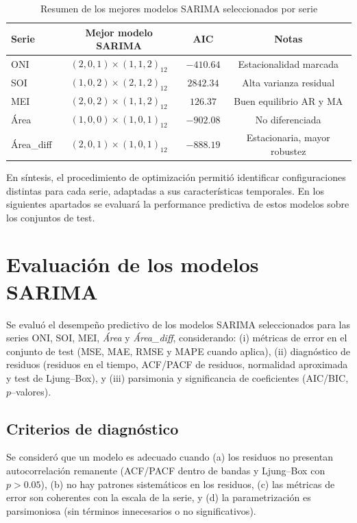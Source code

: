 \begin{table}[H]
    \centering
    \caption{Resumen de los mejores modelos SARIMA seleccionados por serie}
    \begin{tabular}{lccc}
        \toprule
        \textbf{Serie} & \textbf{Mejor modelo SARIMA} & \textbf{AIC} & \textbf{Notas} \\
        \midrule
        ONI   & $(2,0,1)\times(1,1,2)_{12}$ & $-410.64$ & Estacionalidad marcada \\
        SOI   & $(1,0,2)\times(2,1,2)_{12}$ & $2842.34$ & Alta varianza residual \\
        MEI   & $(2,0,2)\times(1,1,2)_{12}$ & $126.37$  & Buen equilibrio AR y MA \\
        Área  & $(1,0,0)\times(1,0,1)_{12}$ & $-902.08$ & No diferenciada \\
        Área\_diff & $(2,0,1)\times(1,0,1)_{12}$ & $-888.19$ & Estacionaria, mayor robustez \\
        \bottomrule
    \end{tabular}
    \label{tab:sarima_modelos}
\end{table}

En síntesis, el procedimiento de optimización permitió identificar configuraciones distintas para cada serie, adaptadas a sus características temporales. En los siguientes apartados se evaluará la performance predictiva de estos modelos sobre los conjuntos de test.

\section{Evaluación de los modelos SARIMA}

Se evaluó el desempeño predictivo de los modelos SARIMA seleccionados para las series
ONI, SOI, MEI, \emph{Área} y \emph{Área\_diff}, considerando: (i) métricas de error en el
conjunto de test (MSE, MAE, RMSE y MAPE cuando aplica), (ii) diagnóstico de residuos
(residuos en el tiempo, ACF/PACF de residuos, normalidad aproximada y test de Ljung--Box),
y (iii) parsimonia y significancia de coeficientes (AIC/BIC, $p$--valores).

\subsection{Criterios de diagnóstico}
Se consideró que un modelo es adecuado cuando (a) los residuos no presentan
autocorrelación remanente (ACF/PACF dentro de bandas y Ljung--Box con $p>0.05$), (b) no hay
patrones sistemáticos en los residuos, (c) las métricas de error son coherentes con la
escala de la serie, y (d) la parametrización es parsimoniosa (sin términos
innecesarios o no significativos).

